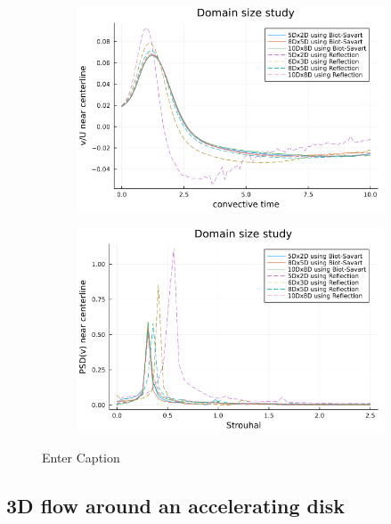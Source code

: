 \documentclass{article}
\begin{document}
\begin{figure}
    \centering
    \begin{subfigure}{.5\textwidth}
        \centering
        \includegraphics[width=\textwidth]{tex//fig/start.png}
    \end{subfigure}%
    \begin{subfigure}{.5\textwidth}
        \centering
        \includegraphics[width=\textwidth]{tex/fig/fft.png}
    \end{subfigure}
    \caption{Enter Caption}
    \label{fig:cylinder_flow}
\end{figure}

\subsection{3D flow around an accelerating disk}
\end{document}

